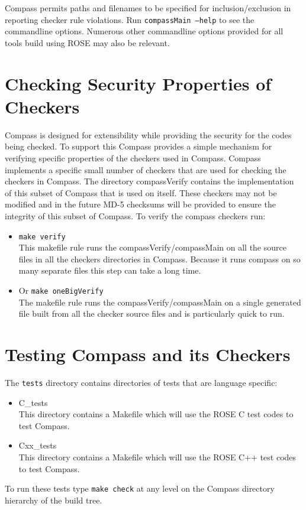     Compass permits paths and filenames to be specified for inclusion/exclusion
in reporting checker rule violations.  Run {\tt compassMain --help} to see
the commandline options.  Numerous other commandline options provided for all
tools build using ROSE may also be relevant.



\section{Checking Security Properties of Checkers}
\label{sec:compass_verify}

    Compass is designed for extensibility while providing the security for
the codes being checked.  To support this Compass provides a simple
mechanism for verifying specific properties of the checkers used in Compass.
Compass implements a specific small number of checkers that are used for checking
the checkers in Compass.  The directory compassVerify contains the implementation
of this subset of Compass that is used on itself.  These checkers may not
be modified and in the future MD-5 checksums will be provided to ensure the
integrity of this subset of Compass.  To verify the compass checkers run:
\begin{itemize}
   \item {\tt make verify} \\
        This makefile rule runs the compassVerify/compassMain on all the source files in
    all the checkers directories in Compass.  Because it runs compass on so
    many separate
    files this step can take a long time.
   \item Or {\tt make oneBigVerify} \\
        The makefile rule runs the compassVerify/compassMain on a single generated file
    built from all the checker source files and is particularly quick to run.
\end{itemize}



\section{Testing Compass and its Checkers}

   The {\tt tests} directory contains directories of tests that
are language specific:
\begin{itemize}
   \item C\_tests \\ 
         This directory contains a Makefile which will use the ROSE C test codes 
         to test Compass.
   \item Cxx\_tests \\ 
         This directory contains a Makefile which will use the ROSE C++ test codes 
         to test Compass.
\end{itemize}
To run these tests type {\tt make check} at any level on the Compass directory
hierarchy of the build tree.


